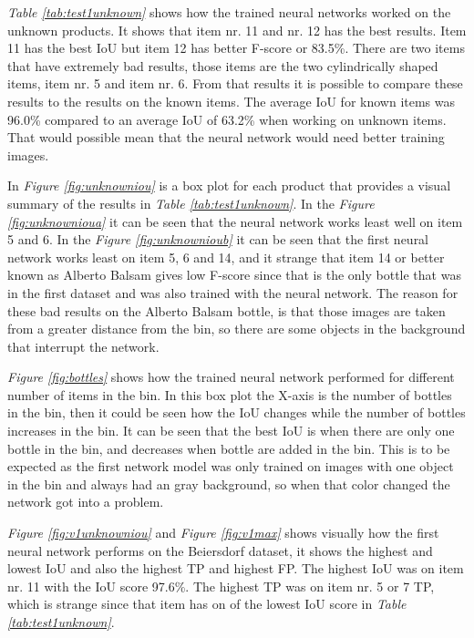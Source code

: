 \textit{Table \ref{tab:test1unknown}} shows how the trained neural networks worked on the unknown products. It shows that item nr. 11 and nr. 12 has the best results. Item 11 has the best IoU but item 12 has better F-score or 83.5\%. There are two items that have extremely bad results, those items are the two cylindrically shaped items, item nr. 5 and item nr. 6. From that results it is possible to compare these results to the results on the known items. The average IoU for known items was 96.0\% compared to an average IoU of 63.2\% when working on unknown items. That would possible mean that the neural network would need better training images. 

In \textit{Figure \ref{fig:unknowniou}} is a box plot for each product that provides a visual summary of the results in \textit{Table \ref{tab:test1unknown}}. In the \textit{Figure \ref{fig:unknownioua}} it can be seen that the neural network works least well on item 5 and 6. In the \textit{Figure \ref{fig:unknownioub}} it can be seen that the first neural network works least on item 5, 6 and 14, and it strange that item 14 or better known as Alberto Balsam gives low F-score since that is the only bottle that was in the first dataset and was also trained with the neural network. The reason for these bad results on the Alberto Balsam bottle, is that those images are taken from a greater distance from the bin, so there are some objects in the background that interrupt the network. 

\textit{Figure \ref{fig:bottles}} shows how the trained neural network performed for different number of items in the bin. In this box plot the X-axis is the number of bottles in the bin, then it could be seen how the IoU changes while the number of bottles increases in the bin. It can be seen that the best IoU is when there are only one bottle in the bin, and decreases when bottle are added in the bin. This is to be expected as the first network model was only trained on images with one object in the bin and always had an gray background, so when that color changed the network got into a problem.

\textit{Figure \ref{fig:v1unknowniou}} and \textit{Figure \ref{fig:v1max}} shows visually how the first neural network performs on the Beiersdorf dataset, it shows the highest and lowest IoU and also the highest TP and highest FP. The highest IoU was on item nr. 11 with the IoU score 97.6\%. The highest TP was on item nr. 5 or 7 TP, which is strange since that item has on of the lowest IoU score in \textit{Table \ref{tab:test1unknown}}.

